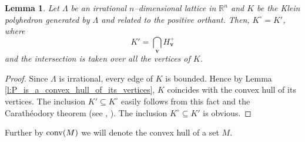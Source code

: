 \documentclass[11pt]{article}
\theoremstyle{definition}
\theoremstyle{remark}
\theoremstyle{plain}
\newtheorem{lemma}{Lemma}
\renewcommand{\vec}[1]{\mathbf{#1}}
\newcommand{\conv}{\textup{conv}}
\newcommand{\La}{\Lambda}
\newcommand{\R}{\mathbb{R}}
\begin{document}
  \begin{lemma} \label{l:K_circ_equals_K_prime}
    Let $\La$ be an irrational $n$--dimensional lattice in $\R^n$ and $K$ be the Klein
    polyhedron generated by $\La$ and related to the positive orthant. Then, $K^\circ=K'$,
    where
    \[ K'=\bigcap_{\vec v}H_{\vec v}^+ \]
    and the intersection is taken over all the vertices of $K$.
  \end{lemma}

  \begin{proof}
    Since $\La$ is irrational, every edge of $K$ is bounded. Hence by
    Lemma\,\ref{l:P_is_a_convex_hull_of_its_vertices}, $K$ coincides with the convex hull
    of its vertices. The inclusion $K'\subseteq K^\circ$ easily follows from this fact and
    the Carath\'eodory theorem (see \cite{grunbaum}, \cite{danzer_grunbaum_klee}). The
    inclusion $K^\circ\subseteq K'$ is obvious.
  \end{proof}

  Further by $\conv(M)$ we will denote the convex hull of a set $M$.
\end{document}
